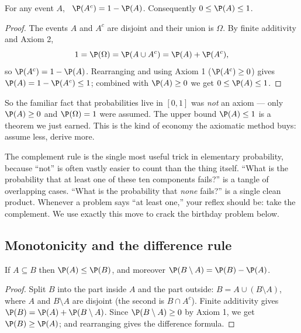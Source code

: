 \begin{proposition}
\label{ch03:prop-complement}
For any event $A$, \ $\P(A^c) = 1 - \P(A)$. Consequently $0 \le \P(A) \le 1$.
\end{proposition}

\begin{proof}
The events $A$ and $A^c$ are disjoint and their union is $\Omega$. By finite
additivity and Axiom 2,
\[
1 = \P(\Omega) = \P(A \cup A^c) = \P(A) + \P(A^c),
\]
so $\P(A^c) = 1 - \P(A)$. Rearranging and using Axiom 1 ($\P(A^c) \ge 0$) gives
$\P(A) = 1 - \P(A^c) \le 1$; combined with $\P(A) \ge 0$ we get
$0 \le \P(A) \le 1$.
\end{proof}

So the familiar fact that probabilities live in $[0,1]$ was \emph{not} an axiom
--- only $\P(A)\ge 0$ and $\P(\Omega)=1$ were assumed. The upper bound $\P(A)\le1$
is a theorem we just earned. This is the kind of economy the axiomatic method
buys: assume less, derive more.

\begin{aestheticbox}
The complement rule is the single most useful trick in elementary probability,
because ``not'' is often vastly easier to count than the thing itself. ``What is
the probability that at least one of these ten components fails?'' is a tangle of
overlapping cases. ``What is the probability that \emph{none} fails?'' is a single
clean product. Whenever a problem says ``at least one,'' your reflex should be:
take the complement. We use exactly this move to crack the birthday problem
below.
\end{aestheticbox}

\subsection{Monotonicity and the difference rule}
\label{ch03:monotone}

\begin{proposition}[Monotonicity]
\label{ch03:prop-monotone}
If $A \subseteq B$ then $\P(A) \le \P(B)$, and moreover
$\P(B \setminus A) = \P(B) - \P(A)$.
\end{proposition}

\begin{proof}
Split $B$ into the part inside $A$ and the part outside: $B = A \cup
(B \setminus A)$, where $A$ and $B \setminus A$ are disjoint (the second is
$B \cap A^c$). Finite additivity gives
$\P(B) = \P(A) + \P(B \setminus A)$. Since $\P(B \setminus A) \ge 0$ by Axiom 1,
we get $\P(B) \ge \P(A)$; and rearranging gives the difference formula.
\end{proof}

